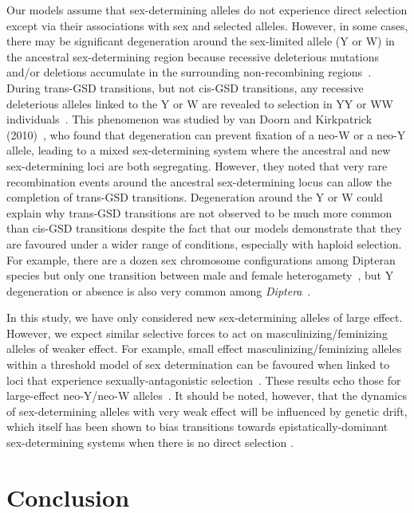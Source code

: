 \documentclass[10pt,letterpaper]{article}
\begin{document}
Our models assume that sex-determining alleles do not experience direct selection except via their associations with sex and selected alleles.
However, in some cases, there may be significant degeneration around the sex-limited allele (Y or W) in the ancestral sex-determining region because recessive deleterious mutations and/or deletions accumulate in the surrounding non-recombining regions~\cite{Rice:1996ke,Charlesworth:2000cc,Bachtrog:2006ed,Marais:2008hm}. 
During trans-GSD transitions, but not cis-GSD transitions, any recessive deleterious alleles linked to the Y or W are revealed to selection in YY or WW individuals~\cite{Bachtrog:2014bx}. 
This phenomenon was studied by van Doorn and Kirkpatrick (2010)~\cite{vanDoorn:2010hu}, who found that degeneration can prevent fixation of a neo-W or a neo-Y allele, leading to a mixed sex-determining system where the ancestral and new sex-determining loci are both segregating. 
However, they noted that very rare recombination events around the ancestral sex-determining locus can allow the completion of trans-GSD transitions.  
Degeneration around the Y or W could explain why trans-GSD transitions are not observed to be much more common than cis-GSD transitions despite the fact that our models demonstrate that they are favoured under a wider range of conditions, especially with haploid selection. 
For example, there are a dozen sex chromosome configurations among Dipteran species but only one transition between male and female heterogamety~\cite{Vicoso:2015hf}, but Y degeneration or absence is also very common among \textit{Diptera}~\cite{Vicoso:2015hf}. 

In this study, we have only considered new sex-determining alleles of large effect. 
However, we expect similar selective forces to act on masculinizing/feminizing alleles of weaker effect.
For example, small effect masculinizing/feminizing alleles within a threshold model of sex determination can be favoured when linked to loci that experience sexually-antagonistic selection~\cite{Muralidhar2018}. 
These results echo those for large-effect neo-Y/neo-W alleles~\cite{vanDoorn:2007eu,vanDoorn:2010hu}.
It should be noted, however, that the dynamics of sex-determining alleles with very weak effect will be influenced by genetic drift, which itself has been shown to bias transitions towards epistatically-dominant sex-determining systems when there is no direct selection \cite{Veller2017}.

\section*{Conclusion}
\end{document}
